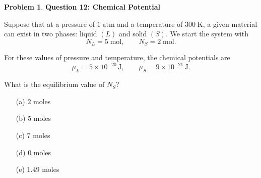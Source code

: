 \documentclass[10pt]{article}
\theoremstyle{definition} %
\newtheorem{problem}{Problem}
\theoremstyle{plain} %
\begin{document}
                    \begin{problem}
                      \textbf{Question 12: Chemical Potential}
                      
                      Suppose that at a pressure of \(1\;\text{atm}\) and a temperature of
                      \(300\;\text{K}\), a given material can exist in two phases:
                      liquid \((L)\) and solid \((S)\).
                      We start the system with
                      \[
                         N_{L}=5\;\text{mol}, \qquad
                         N_{S}=2\;\text{mol}.
                      \]
                      
                      For these values of pressure and temperature, the chemical potentials are
                      \[
                         \mu_{L}=5\times10^{-20}\,\text{J}, \qquad
                         \mu_{S}=9\times10^{-21}\,\text{J}.
                      \]
                      
                      \medskip
                      What is the equilibrium value of \(N_{S}\)?
                      
                      \begin{enumerate}
                        \item[(a)] \(2\) moles
                        \item[(b)] \(5\) moles
                        \item[(c)] \(7\) moles
                        \item[(d)] \(0\) moles
                        \item[(e)] \(1.49\) moles
                      \end{enumerate}
                      \end{problem}
\end{document}
